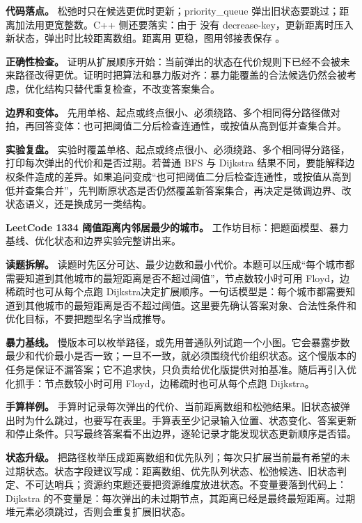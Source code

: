 \textbf{代码落点。} 松弛时只在候选更优时更新；priority\_queue 弹出旧状态要跳过；距离加法用更宽整数。C++ 侧还要落实：由于  没有 decrease-key，更新距离时压入新状态，弹出时比较距离数组。距离用  更稳，图用邻接表保存 。

\textbf{正确性检查。} 证明从扩展顺序开始：当前弹出的状态在代价规则下已经不会被未来路径改得更优。证明时把算法和暴力版对齐：暴力能覆盖的合法候选仍然会被考虑，优化结构只替代重复检查，不改变答案集合。

\textbf{边界和变体。} 先用单格、起点或终点很小、必须绕路、多个相同得分路径做对拍，再回答变体：也可把阈值二分后检查连通性，或按值从高到低并查集合并。

\textbf{实验复盘。} 实验时覆盖单格、起点或终点很小、必须绕路、多个相同得分路径，打印每次弹出的代价和是否过期。若普通 BFS 与 Dijkstra 结果不同，要能解释边权条件造成的差异。如果追问变成“也可把阈值二分后检查连通性，或按值从高到低并查集合并”，先判断原状态是否仍然覆盖新答案集合，再决定是微调边界、改状态语义，还是换成另一类结构。

\noindent\textbf{LeetCode 1334 阈值距离内邻居最少的城市。} 工作坊目标：把题面模型、暴力基线、优化状态和边界实验完整讲出来。

\textbf{读题拆解。} 读题时先区分可达、最少边数和最小代价。本题可以压成“每个城市都需要知道到其他城市的最短距离是否不超过阈值”，节点数较小时可用 Floyd，边稀疏时也可从每个点跑 Dijkstra决定扩展顺序。一句话模型是：每个城市都需要知道到其他城市的最短距离是否不超过阈值。这里要先确认答案对象、合法性条件和优化目标，不要把题型名字当成推导。

\textbf{暴力基线。} 慢版本可以枚举路径，或先用普通队列试跑一个小图。它会暴露步数最少和代价最小是否一致；一旦不一致，就必须围绕代价组织状态。这个慢版本的任务是保证不漏答案；它不追求快，只负责给优化版提供对拍基准。随后再引入优化抓手：节点数较小时可用 Floyd，边稀疏时也可从每个点跑 Dijkstra。

\textbf{手算样例。} 手算时记录每次弹出的代价、当前距离数组和松弛结果。旧状态被弹出时为什么跳过，也要写在表里。手算表至少记录输入位置、状态变化、答案更新和停止条件。只写最终答案看不出边界，逐轮记录才能发现状态更新顺序是否错。

\textbf{状态升级。} 把路径枚举压成距离数组和优先队列；每次只扩展当前最有希望的未过期状态。状态字段建议写成：距离数组、优先队列状态、松弛候选、旧状态判定、不可达哨兵；资源约束题还要把资源维度放进状态。不变量要落到代码上：Dijkstra 的不变量是：每次弹出的未过期节点，其距离已经是最终最短距离。过期堆元素必须跳过，否则会重复扩展旧状态。

